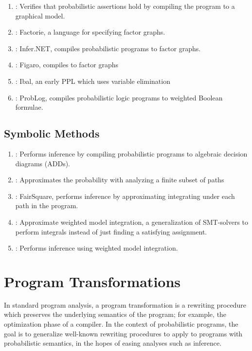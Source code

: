 \documentclass{article}
\begin{document}
\begin{enumerate}
\item \citep{Sampson2014}: Verifies that probabilistic assertions hold by
  compiling the program to a graphical model.
\item \citep{McCallum2009}: Factorie, a language for specifying factor graphs.
\item \citep{InferNET14}: Infer.NET, compiles probabilistic programs to factor
  graphs.
\item \citep{pfeffer2009figaro}: Figaro, compiles to factor graphs
\item \citep{pfeffer2001ibal}: Ibal, an early PPL which uses variable elimination
\item \citep{Fierens2013}: ProbLog, compiles probabilistic logic programs to
  weighted Boolean formulae.
\end{enumerate}

\subsection{Symbolic Methods}

\begin{enumerate}
\item \citep{Claret2013}: Performs inference by compiling probabilistic programs
  to algebraic decision diagrams (ADDs).
\item \citep{Sankaranarayanan:2013}: Approximates the probability with analyzing
  a finite subset of paths
\item \citep{Albarghouthi2017}: FairSquare, performs inference by approximating
  integrating under each path in the program.
\item \citep{BelleIJCAI15}: Approximate weighted model integration, a generalization of
  SMT-solvers to perform integrals instead of just finding a satisfying assignment.
\item \citep{Chistikov2015}: Performs inference using weighted model integration.
\end{enumerate}

\section{Program Transformations}
In standard program analysis, a program transformation is a rewriting procedure
which preserves the underlying semantics of the program; for example, the
optimization phase of a compiler. In the context of probabilistic programs, the
goal is to generalize well-known rewriting procedures to apply to programs with
probabilistic semantics, in the hopes of easing analyses such as inference.
\end{document}
